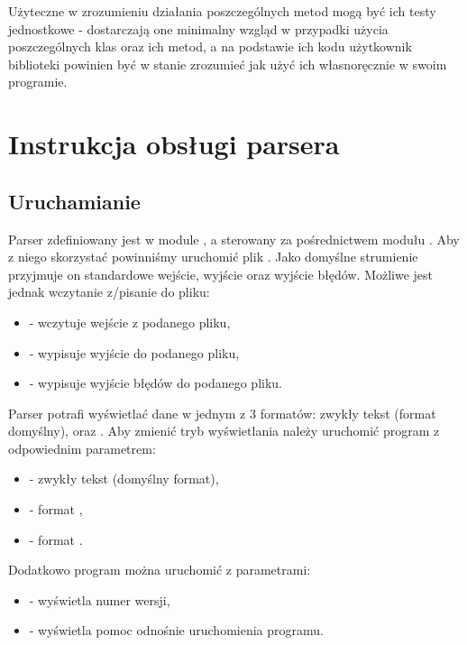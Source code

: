 \documentclass[polish]{standalone}
\begin{document}
Użyteczne w zrozumieniu działania poszczególnych metod mogą być ich testy jednostkowe - dostarczają one minimalny wzgląd
w przypadki użycia poszczególnych klas oraz ich metod, a na podstawie ich kodu użytkownik biblioteki powinien być w
stanie zrozumieć jak użyć ich własnoręcznie w swoim programie.

\chapter{Instrukcja obsługi parsera}

\section{Uruchamianie}

Parser zdefiniowany jest w module , a sterowany za pośrednictwem modułu . Aby z niego skorzystać
powinniśmy uruchomić plik . Jako domyślne strumienie przyjmuje on standardowe wejście, wyjście
oraz wyjście błędów. Możliwe jest jednak wczytanie z/pisanie do pliku:
\begin{itemize}
\item {} - wczytuje wejście z podanego pliku,
\item {} - wypisuje wyjście do podanego pliku,
\item {} - wypisuje wyjście błędów do podanego pliku.
\end{itemize}

Parser potrafi wyświetlać dane w jednym z 3 formatów: zwykły tekst (format domyślny),  oraz . Aby
zmienić tryb wyświetlania należy uruchomić program z odpowiednim parametrem:
\begin{itemize}
\item {} - zwykły tekst (domyślny format),
\item {} - format ,
\item {} - format .
\end{itemize}

Dodatkowo program można uruchomić z parametrami:
\begin{itemize}
\item {} - wyświetla numer wersji,
\item {} - wyświetla pomoc odnośnie uruchomienia programu.
\end{itemize}
\end{document}
